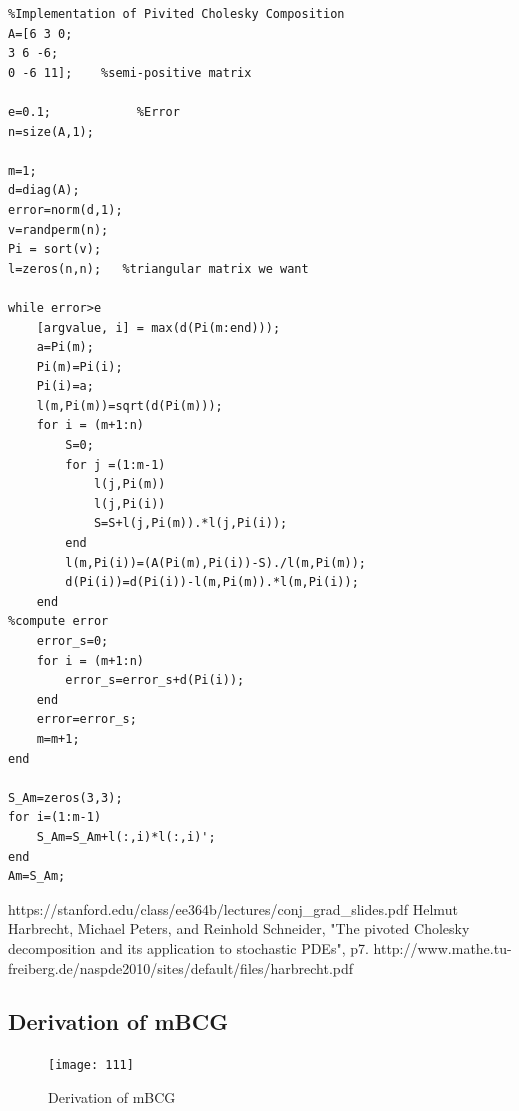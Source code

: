 \documentclass{article} %
\newcounter{math}
\begin{document}
\begin{lstlisting}
%Implementation of Pivited Cholesky Composition
A=[6 3 0;
3 6 -6;
0 -6 11];    %semi-positive matrix

e=0.1;            %Error
n=size(A,1);

m=1;
d=diag(A);
error=norm(d,1);
v=randperm(n);
Pi = sort(v);
l=zeros(n,n);   %triangular matrix we want 

while error>e
	[argvalue, i] = max(d(Pi(m:end)));
	a=Pi(m);
	Pi(m)=Pi(i);
	Pi(i)=a;
	l(m,Pi(m))=sqrt(d(Pi(m)));
	for i = (m+1:n)
		S=0;
		for j =(1:m-1)
			l(j,Pi(m))
			l(j,Pi(i))
			S=S+l(j,Pi(m)).*l(j,Pi(i));
		end
		l(m,Pi(i))=(A(Pi(m),Pi(i))-S)./l(m,Pi(m));
		d(Pi(i))=d(Pi(i))-l(m,Pi(m)).*l(m,Pi(i));
	end
%compute error
	error_s=0;
	for i = (m+1:n)
		error_s=error_s+d(Pi(i));
	end
	error=error_s;
	m=m+1;      
end

S_Am=zeros(3,3);
for i=(1:m-1)
	S_Am=S_Am+l(:,i)*l(:,i)';
end
Am=S_Am;

\end{lstlisting}

\begin{thebibliography}{1}
	
	https://stanford.edu/class/ee364b/lectures/conj\_grad\_slides.pdf
	Helmut Harbrecht, Michael Peters, and Reinhold Schneider, "The pivoted Cholesky decomposition
	and its application to stochastic PDEs", p7.
	http://www.mathe.tu-freiberg.de/naspde2010/sites/default/files/harbrecht.pdf
\end{thebibliography}
\begin{appendices}
\section{Derivation of mBCG}
 \begin{figure}[H]
	\begin{center}
		\texttt{[image: 111]}
	\end{center}
	\caption{Derivation of mBCG}
	\label{fig2}
\end{figure}
\end{appendices}
\end{document}
